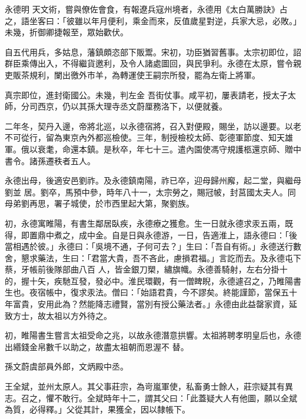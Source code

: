 \begin{pinyinscope}
 永德明
 天文術，嘗與僚佐會食，有報遼兵寇州境者，永德用《太白萬勝訣》占之，語坐客曰：「彼雖以年月便利，乘金而來，反值歲星對逆，兵家大忌，必敗。」未幾，折御卿捷報至，眾始歡伏。



 自五代用兵，多姑息，藩鎮頗恣部下販鬻。宋初，功臣猶習舊事。太宗初即位，詔群臣乘傳出入，不得繼貨邀利，及令人諸處圖回，與民爭利。永德在太原，嘗令親吏販茶規利，闌出徼外市羊，為轉運使王嗣宗所發，罷為左衛上將軍。



 真宗即位，進封衛國公。未幾，判左金
 吾街仗事。咸平初，屢表請老，授太子太師，分司西京，仍以其孫大理寺丞文蔚厘務洛下，以便就養。



 二年冬，契丹入邊，帝將北巡，以永德宿將，召入對便殿，賜坐，訪以邊要。以老不可從行，留為東京內外都巡檢使。三年，制授檢校太師、彰德軍節度、知天雄軍。俄以衰耄，命還本鎮。是秋卒，年七十三。遣內園使馮守規護柩還京師、贈中書令。諸孫遷秩者五人。



 永德出母，後適安邑劉祚。及永德鎮南陽，祚已卒，迎母歸州廨，起二堂，與繼母劉並
 居。劉卒，馬預中參，時年八十一，太宗勞之，賜冠帔，封莒國太夫人。同母弟劉再思，署子城使，於市西里起大第，聚劉族。



 初，永德寓睢陽，有書生鄰居臥疾，永德療之獲愈。生一日就永德求汞五兩，既得，即置鼎中煮之，成中金。自是日與永德游，一日，告適淮上，語永德曰：「後當相遇於彼。」永德曰：「吳境不通，子何可去？」生曰：「吾自有術。」永德送行數舍，懇求藥法，生曰：「君當大貴，吾不吝此，慮損君福。」言訖而去。及永德屯下蔡，牙帳前後隊部曲八百
 人，皆金銀刀槊，繡旗幟。永德善騎射，左右分掛十的，握十矢，疾馳互發，發必中。淮民環觀，有一僧睥睨，永德遽召之，乃睢陽書生也。夜宿帳中，復求汞法。僧曰：「始語君貴，今不謬矣。終能謹節，當保五十年富貴，安用此為？然能降志禮賢，當別有授公藥法者。」永德由此益罄家資，延致方士，故太祖以方外待之。



 初，睢陽書生嘗言太祖受命之兆，以故永德潛意拱響。太祖將聘孝明皇后也，永德出緡錢金帛數千以助之，故盡太祖朝而恩渥不
 替。



 孫文蔚虞部員外郎，文炳殿中丞。



 王全斌，並州太原人。其父事莊宗，為岢嵐軍使，私畜勇士餘人，莊宗疑其有異志。召之，懼不敢行。全斌時年十二，謂其父曰：「此蓋疑大人有他圖，願以全斌為質，必得釋。」父從其計，果獲全，因以隸帳下。




\end{pinyinscope}

